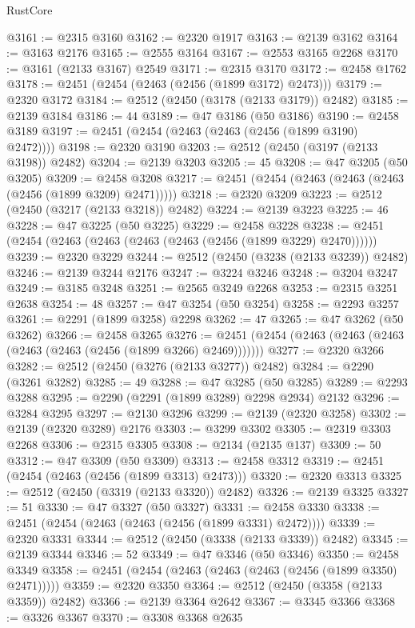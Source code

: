 \begin{lexlean}{RustCore}
\begin{coremodule}
@3161 := @2315 @3160
@3162 := @2320 @1917
@3163 := @2139 @3162
@3164 := @3163 @2176
@3165 := @2555 @3164
@3167 := @2553 @3165 @2268
@3170 := @3161 (@2133 @3167) @2549
@3171 := @2315 @3170
@3172 := @2458 @1762
@3178 := @2451 (@2454 (@2463 (@2456 (@1899 @3172) @2473)))
@3179 := @2320 @3172
@3184 := @2512 (@2450 (@3178 (@2133 @3179)) @2482)
@3185 := @2139 @3184
@3186 := 44
@3189 := @47 @3186 (@50 @3186)
@3190 := @2458 @3189
@3197 := @2451 (@2454 (@2463 (@2463 (@2456 (@1899 @3190) @2472))))
@3198 := @2320 @3190
@3203 := @2512 (@2450 (@3197 (@2133 @3198)) @2482)
@3204 := @2139 @3203
@3205 := 45
@3208 := @47 @3205 (@50 @3205)
@3209 := @2458 @3208
@3217 := @2451 (@2454 (@2463 (@2463 (@2463 (@2456 (@1899 @3209) @2471)))))
@3218 := @2320 @3209
@3223 := @2512 (@2450 (@3217 (@2133 @3218)) @2482)
@3224 := @2139 @3223
@3225 := 46
@3228 := @47 @3225 (@50 @3225)
@3229 := @2458 @3228
@3238 := @2451 (@2454 (@2463 (@2463 (@2463 (@2463 (@2456 (@1899 @3229) @2470))))))
@3239 := @2320 @3229
@3244 := @2512 (@2450 (@3238 (@2133 @3239)) @2482)
@3246 := @2139 @3244 @2176
@3247 := @3224 @3246
@3248 := @3204 @3247
@3249 := @3185 @3248
@3251 := @2565 @3249 @2268
@3253 := @2315 @3251 @2638
@3254 := 48
@3257 := @47 @3254 (@50 @3254)
@3258 := @2293 @3257
@3261 := @2291 (@1899 @3258) @2298
@3262 := 47
@3265 := @47 @3262 (@50 @3262)
@3266 := @2458 @3265
@3276 := @2451 (@2454 (@2463 (@2463 (@2463 (@2463 (@2463 (@2456 (@1899 @3266) @2469)))))))
@3277 := @2320 @3266
@3282 := @2512 (@2450 (@3276 (@2133 @3277)) @2482)
@3284 := @2290 (@3261 @3282)
@3285 := 49
@3288 := @47 @3285 (@50 @3285)
@3289 := @2293 @3288
@3295 := @2290 (@2291 (@1899 @3289) @2298 @2934) @2132
@3296 := @3284 @3295
@3297 := @2130 @3296
@3299 := @2139 (@2320 @3258)
@3302 := @2139 (@2320 @3289) @2176
@3303 := @3299 @3302
@3305 := @2319 @3303 @2268
@3306 := @2315 @3305
@3308 := @2134 (@2135 @137)
@3309 := 50
@3312 := @47 @3309 (@50 @3309)
@3313 := @2458 @3312
@3319 := @2451 (@2454 (@2463 (@2456 (@1899 @3313) @2473)))
@3320 := @2320 @3313
@3325 := @2512 (@2450 (@3319 (@2133 @3320)) @2482)
@3326 := @2139 @3325
@3327 := 51
@3330 := @47 @3327 (@50 @3327)
@3331 := @2458 @3330
@3338 := @2451 (@2454 (@2463 (@2463 (@2456 (@1899 @3331) @2472))))
@3339 := @2320 @3331
@3344 := @2512 (@2450 (@3338 (@2133 @3339)) @2482)
@3345 := @2139 @3344
@3346 := 52
@3349 := @47 @3346 (@50 @3346)
@3350 := @2458 @3349
@3358 := @2451 (@2454 (@2463 (@2463 (@2463 (@2456 (@1899 @3350) @2471)))))
@3359 := @2320 @3350
@3364 := @2512 (@2450 (@3358 (@2133 @3359)) @2482)
@3366 := @2139 @3364 @2642
@3367 := @3345 @3366
@3368 := @3326 @3367
@3370 := @3308 @3368 @2635

\end{coremodule}
\end{lexlean}

